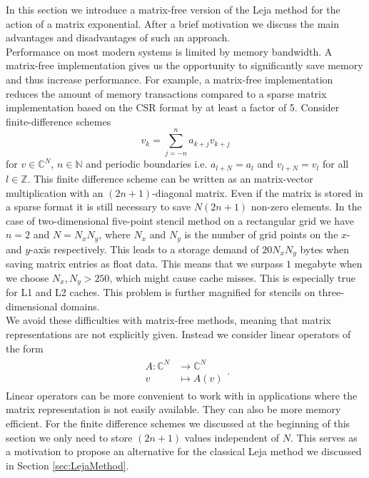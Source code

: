 \documentclass{scrartcl}
\begin{document}
	
	In this section we introduce a matrix-free version of the Leja method for the action of a matrix exponential. After a brief motivation we discuss the main advantages and disadvantages of such an approach. \\
	Performance on most modern systems is limited by memory bandwidth. A matrix-free implementation gives us the opportunity to significantly save memory and thus increase performance. For example, a matrix-free implementation reduces the amount of memory transactions compared to a
	sparse matrix implementation based on the CSR format by at least a
	factor of 5.
	Consider finite-difference schemes
	\[
	v_k = \sum_{j=-n}^{n} a_{k+j}v_{k+j}
	\]
	for $v\in\mathbb{C}^N$, $n\in\mathbb{N}$ and periodic boundaries i.e. $a_{l+N} = a_{l}$ and $v_{l+N}=v_{l}$ for all $l\in\mathbb{Z}$. 
	This finite difference scheme can be written as an matrix-vector multiplication with an $(2n+1)$-diagonal matrix. Even if the matrix is stored in a sparse format it is still necessary to save $N(2n+1)$ non-zero elements. In the case of two-dimensional five-point stencil method on a rectangular grid we have $n=2$ and $N=N_{x}N_{y}$, where $N_{x}$ and $N_{y}$ is the number of grid points on the $x$- and $y$-axis respectively. This leads to a storage demand of $20N_xN_y$ bytes when saving matrix entries as float data. This means that we surpass $1$ megabyte when we choose $N_x,N_y > 250$, which might cause cache misses. This is especially true for L1 and L2 caches. This problem is further magnified for stencils on three-dimensional domains. \\	
	We avoid these difficulties with matrix-free methods, meaning that matrix representations are not explicitly given. Instead we consider linear operators of the form
	\begin{align*}
	\begin{split}
	A\!:\mathbb{C}^{N}&\to\mathbb{C}^{N}\\
	v&\mapsto A(v)
	\end{split}.
	\end{align*}
	Linear operators can be more convenient to work with in applications where the matrix representation is not easily available. They can also be more memory efficient. For the finite difference schemes we discussed at the beginning of this section we only need to store $(2n+1)$ values independent of $N$. This serves as a motivation to propose an alternative for the classical Leja method we discussed in Section \ref{sec:LejaMethod}.
\end{document}
